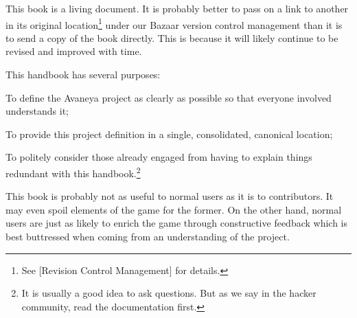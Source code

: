 

This book is a living document. It is probably better to pass on a link to another in its original location\footnote[]{See [Revision Control Management] for details.} under our Bazaar version control management than it is to send a copy of the book directly. This is because it will likely continue to be revised and improved with time.

This handbook has several purposes:

\startitemize[n]
\item
To define the Avaneya project as clearly as possible so that everyone involved understands it;

\item
To provide this project definition in a single, consolidated, canonical location;

\item
To politely consider those already engaged from having to explain things redundant with this handbook.\footnote[rtfm]{It is usually a good idea to ask questions. But as we say in the hacker community, read the documentation first.}
\stopitemize

This book is probably not as useful to normal users as it is to contributors. It may even spoil elements of the game for the former. On the other hand, normal users are just as likely to enrich the game through constructive feedback which is best buttressed when coming from an understanding of the project.

\StopChapter

